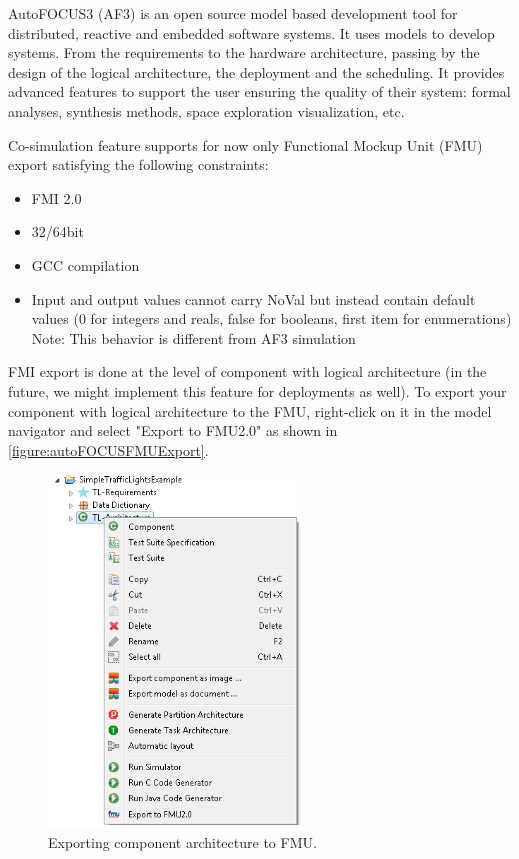 AutoFOCUS3 (AF3) is an open source model based development tool for distributed, reactive and embedded software systems. It uses models to develop systems. From the requirements to the hardware architecture, passing by the design of the logical architecture, the deployment and the scheduling. It provides advanced features to support the user ensuring the quality of their system: formal analyses, synthesis methods, space exploration visualization, etc.

Co-simulation feature supports for now only Functional Mockup Unit (FMU) export satisfying the following constraints:
\begin{itemize}
  \item FMI 2.0
  \item 32/64bit
  \item GCC compilation
  \item Input and output values cannot carry NoVal but instead contain default values (0 for integers and reals, false for booleans, first item for enumerations) Note: This behavior is different from AF3 simulation
\end{itemize}

FMI export is done at the level of component with logical architecture (in the future, we might implement this feature for deployments as well). To export your component with logical architecture to the  FMU, right-click on it in the model navigator and select "Export to FMU2.0" as shown in \autoref{figure:autoFOCUSFMUExport}.

\begin{figure}[ht]
	\centerline{\includegraphics[width=0.6\textwidth]{figures/autoFOCUSFMUExport.png}}
	\caption{Exporting component architecture to FMU.}
	\label{figure:autoFOCUSFMUExport}
\end{figure}

